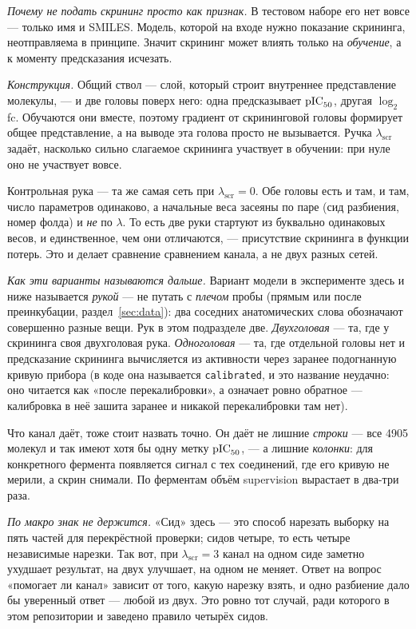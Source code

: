 \emph{Почему не подать скрининг просто как признак.} В тестовом наборе его нет вовсе ---
только имя и SMILES. Модель, которой на входе нужно показание скрининга, неотправляема в
принципе. Значит скрининг может влиять только на \emph{обучение}, а к моменту предсказания
исчезать.

\emph{Конструкция.} Общий ствол --- слой, который строит внутреннее представление молекулы,
--- и две головы поверх него: одна предсказывает $\mathrm{pIC}_{50}$, другая $\log_2$fc. Обучаются они
вместе, поэтому градиент от скрининговой головы формирует общее представление, а на выводе
эта голова просто не вызывается. Ручка $\lambda_{\text{scr}}$ задаёт, насколько сильно
слагаемое скрининга участвует в обучении: при нуле оно не участвует вовсе.

Контрольная рука --- та же самая сеть при $\lambda_{\text{scr}} = 0$. Обе головы есть и там,
и там, число параметров одинаково, а начальные веса засеяны по паре (сид разбиения, номер
фолда) и \emph{не} по $\lambda$. То есть две руки стартуют из буквально одинаковых весов, и
единственное, чем они отличаются, --- присутствие скрининга в функции потерь. Это и делает
сравнение сравнением канала, а не двух разных сетей.

\emph{Как эти варианты называются дальше.} Вариант модели в эксперименте здесь и ниже
называется \emph{рукой} --- не путать с \emph{плечом} пробы (прямым или после преинкубации,
раздел~\ref{sec:data}): два соседних анатомических слова обозначают совершенно разные вещи.
Рук в этом подразделе две. \emph{Двухголовая} --- та, где у скрининга своя двухголовая рука.
\emph{Одноголовая} --- та, где отдельной головы нет и предсказание скрининга вычисляется из
активности через заранее подогнанную кривую прибора (в коде она называется \texttt{calibrated},
и это название неудачно: оно читается как «после перекалибровки», а означает ровно обратное ---
калибровка в неё зашита заранее и никакой перекалибровки там нет).

Что канал даёт, тоже стоит назвать точно. Он даёт не лишние \emph{строки} --- все 4905
молекул и так имеют хотя бы одну метку $\mathrm{pIC}_{50}$, --- а лишние \emph{колонки}: для конкретного
фермента появляется сигнал с тех соединений, где его кривую не мерили, а скрин снимали. По
ферментам объём supervision вырастает в два-три раза.

\emph{По макро знак не держится.} «Сид» здесь --- это способ нарезать выборку на пять
частей для перекрёстной проверки; сидов четыре, то есть четыре независимые нарезки. Так вот,
при $\lambda_{\text{scr}} = 3$ канал на одном сиде заметно ухудшает результат, на двух
улучшает, на одном не меняет. Ответ на вопрос «помогает ли канал» зависит от того, какую
нарезку взять, и одно разбиение дало бы уверенный ответ --- любой из двух. Это ровно тот
случай, ради которого в этом репозитории и заведено правило четырёх сидов.

